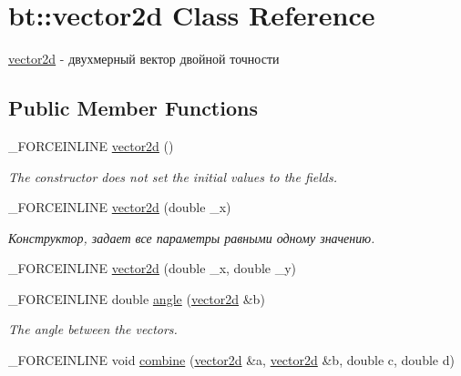 \hypertarget{classbt_1_1vector2d}{\section{bt\-:\-:vector2d Class Reference}
\label{classbt_1_1vector2d}
}


\hyperlink{classbt_1_1vector2d}{vector2d} -\/ двухмерный вектор двойной точности  


\subsection*{Public Member Functions}
\begin{DoxyCompactItemize}
\item 
\hypertarget{classbt_1_1vector2d_a83cb65d7c85c277f8ab7fe54680ac713}{\-\_\-\-F\-O\-R\-C\-E\-I\-N\-L\-I\-N\-E \hyperlink{classbt_1_1vector2d_a83cb65d7c85c277f8ab7fe54680ac713}{vector2d} ()}\label{classbt_1_1vector2d_a83cb65d7c85c277f8ab7fe54680ac713}

\begin{DoxyCompactList}\small\item\em The constructor does not set the initial values to the fields. \end{DoxyCompactList}\item 
\hypertarget{classbt_1_1vector2d_ac3da88970f4d5cba6f5f2a26c0591936}{\-\_\-\-F\-O\-R\-C\-E\-I\-N\-L\-I\-N\-E \hyperlink{classbt_1_1vector2d_ac3da88970f4d5cba6f5f2a26c0591936}{vector2d} (double \-\_\-x)}\label{classbt_1_1vector2d_ac3da88970f4d5cba6f5f2a26c0591936}

\begin{DoxyCompactList}\small\item\em Конструктор, задает все параметры равными одному значению. \end{DoxyCompactList}\item 
\-\_\-\-F\-O\-R\-C\-E\-I\-N\-L\-I\-N\-E \hyperlink{classbt_1_1vector2d_a0acb6b17495f30824d35bf7203de6b3a}{vector2d} (double \-\_\-x, double \-\_\-y)
\item 
\hypertarget{classbt_1_1vector2d_a0bbfe3364e59f574ba6570e02794d93a}{\-\_\-\-F\-O\-R\-C\-E\-I\-N\-L\-I\-N\-E double \hyperlink{classbt_1_1vector2d_a0bbfe3364e59f574ba6570e02794d93a}{angle} (\hyperlink{classbt_1_1vector2d}{vector2d} \&b)}\label{classbt_1_1vector2d_a0bbfe3364e59f574ba6570e02794d93a}

\begin{DoxyCompactList}\small\item\em The angle between the vectors. \end{DoxyCompactList}\item 
\hypertarget{classbt_1_1vector2d_ae2b4b9b2114984cf11d9abfd410c8f5e}{\-\_\-\-F\-O\-R\-C\-E\-I\-N\-L\-I\-N\-E void \hyperlink{classbt_1_1vector2d_ae2b4b9b2114984cf11d9abfd410c8f5e}{combine} (\hyperlink{classbt_1_1vector2d}{vector2d} \&a, \hyperlink{classbt_1_1vector2d}{vector2d} \&b, double c, double d)}\label{classbt_1_1vector2d_ae2b4b9b2114984cf11d9abfd410c8f5e}


\end{DoxyCompactItemize}
